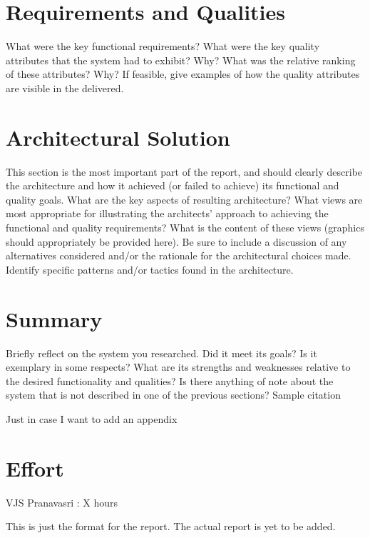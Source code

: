 \documentclass[conference, onecolumn]{IEEEtran}
\begin{document}
\section{Requirements and Qualities}
\color{blue}
What were the key functional requirements? What were the key quality attributes that the system had to exhibit? Why? What was the relative ranking of these attributes? Why? If feasible, give examples of how the quality attributes are visible in the delivered.
\color{black}

\section{Architectural Solution}
\color{blue}
This section is the most important part of the report, and should clearly describe the architecture and how it achieved (or failed to achieve) its functional and quality goals.
What are the key aspects of resulting architecture? What views are most appropriate for illustrating the architects' approach to achieving the functional and quality requirements? What is the content of these views (graphics should appropriately be provided here). Be sure to include a discussion of any alternatives considered and/or the rationale for the architectural choices made. Identify specific patterns and/or tactics found in the architecture.
\color{black}

\section{Summary}
\color{blue}
Briefly reflect on the system you researched. Did it meet its goals? Is it exemplary in some respects? What are its strengths and weaknesses relative to the desired functionality and qualities? Is there anything of note about the system that is not described in one of the previous sections?
Sample citation\cite{IEEEexample:confwithadddays}
\color{black}




\appendix
Just in case I want to add an appendix

\section*{Effort}
VJS Pranavasri : X hours

\vspace{12pt}
\color{red}
This is just the format for the report. The actual report is yet to be added.
\end{document}
